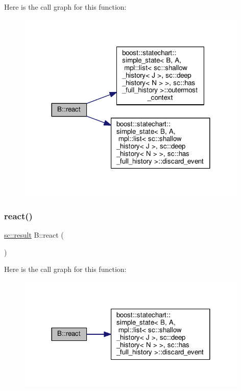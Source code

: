 Here is the call graph for this function\+:
\nopagebreak
\begin{figure}[H]
\begin{center}
\leavevmode
\includegraphics[width=312pt]{struct_b_af883c81d64b442ed4252a406a2710459_cgraph}
\end{center}
\end{figure}
\mbox{\label{struct_b_a6ef8f2fd99e04b465b39ea65056ebc10}} 
\subsubsection{\texorpdfstring{react()}{react()}\hspace{0.1cm}{\footnotesize\ttfamily [3/3]}}
{\footnotesize\ttfamily \mbox{\hyperlink{namespaceboost_1_1statechart_abe807f6598b614d6d87bb951ecd92331}{sc\+::result}} B\+::react (\begin{DoxyParamCaption}\item[{const \mbox{\hyperlink{struct_ev_discard_in_d}{Ev\+Discard\+InD}} \&}]{ }\end{DoxyParamCaption})\hspace{0.3cm}{\ttfamily [inline]}}

Here is the call graph for this function\+:
\nopagebreak
\begin{figure}[H]
\begin{center}
\leavevmode
\includegraphics[width=312pt]{struct_b_a6ef8f2fd99e04b465b39ea65056ebc10_cgraph}
\end{center}
\end{figure}


